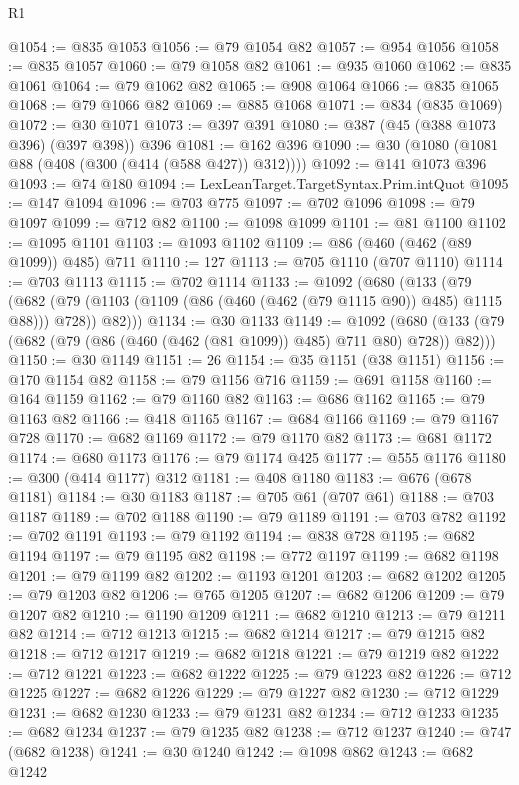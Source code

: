 \begin{lexlean}{R1}
\begin{coremodule}
@1054 := @835 @1053
@1056 := @79 @1054 @82
@1057 := @954 @1056
@1058 := @835 @1057
@1060 := @79 @1058 @82
@1061 := @935 @1060
@1062 := @835 @1061
@1064 := @79 @1062 @82
@1065 := @908 @1064
@1066 := @835 @1065
@1068 := @79 @1066 @82
@1069 := @885 @1068
@1071 := @834 (@835 @1069)
@1072 := @30 @1071
@1073 := @397 @391
@1080 := @387 (@45 (@388 @1073 @396) (@397 @398)) @396
@1081 := @162 @396
@1090 := @30 (@1080 (@1081 @88 (@408 (@300 (@414 (@588 @427)) @312))))
@1092 := @141 @1073 @396
@1093 := @74 @180
@1094 := LexLeanTarget.TargetSyntax.Prim.intQuot
@1095 := @147 @1094
@1096 := @703 @775
@1097 := @702 @1096
@1098 := @79 @1097
@1099 := @712 @82
@1100 := @1098 @1099
@1101 := @81 @1100
@1102 := @1095 @1101
@1103 := @1093 @1102
@1109 := @86 (@460 (@462 (@89 @1099)) @485) @711
@1110 := 127
@1113 := @705 @1110 (@707 @1110)
@1114 := @703 @1113
@1115 := @702 @1114
@1133 := @1092
    (@680
      (@133
        (@79
          (@682 (@79 (@1103 (@1109 (@86 (@460 (@462 (@79 @1115 @90)) @485) @1115 @88))) @728))
          @82)))
@1134 := @30 @1133
@1149 := @1092
    (@680 (@133 (@79 (@682 (@79 (@86 (@460 (@462 (@81 @1099)) @485) @711 @80) @728)) @82)))
@1150 := @30 @1149
@1151 := 26
@1154 := @35 @1151 (@38 @1151)
@1156 := @170 @1154 @82
@1158 := @79 @1156 @716
@1159 := @691 @1158
@1160 := @164 @1159
@1162 := @79 @1160 @82
@1163 := @686 @1162
@1165 := @79 @1163 @82
@1166 := @418 @1165
@1167 := @684 @1166
@1169 := @79 @1167 @728
@1170 := @682 @1169
@1172 := @79 @1170 @82
@1173 := @681 @1172
@1174 := @680 @1173
@1176 := @79 @1174 @425
@1177 := @555 @1176
@1180 := @300 (@414 @1177) @312
@1181 := @408 @1180
@1183 := @676 (@678 @1181)
@1184 := @30 @1183
@1187 := @705 @61 (@707 @61)
@1188 := @703 @1187
@1189 := @702 @1188
@1190 := @79 @1189
@1191 := @703 @782
@1192 := @702 @1191
@1193 := @79 @1192
@1194 := @838 @728
@1195 := @682 @1194
@1197 := @79 @1195 @82
@1198 := @772 @1197
@1199 := @682 @1198
@1201 := @79 @1199 @82
@1202 := @1193 @1201
@1203 := @682 @1202
@1205 := @79 @1203 @82
@1206 := @765 @1205
@1207 := @682 @1206
@1209 := @79 @1207 @82
@1210 := @1190 @1209
@1211 := @682 @1210
@1213 := @79 @1211 @82
@1214 := @712 @1213
@1215 := @682 @1214
@1217 := @79 @1215 @82
@1218 := @712 @1217
@1219 := @682 @1218
@1221 := @79 @1219 @82
@1222 := @712 @1221
@1223 := @682 @1222
@1225 := @79 @1223 @82
@1226 := @712 @1225
@1227 := @682 @1226
@1229 := @79 @1227 @82
@1230 := @712 @1229
@1231 := @682 @1230
@1233 := @79 @1231 @82
@1234 := @712 @1233
@1235 := @682 @1234
@1237 := @79 @1235 @82
@1238 := @712 @1237
@1240 := @747 (@682 @1238)
@1241 := @30 @1240
@1242 := @1098 @862
@1243 := @682 @1242

\end{coremodule}
\end{lexlean}
